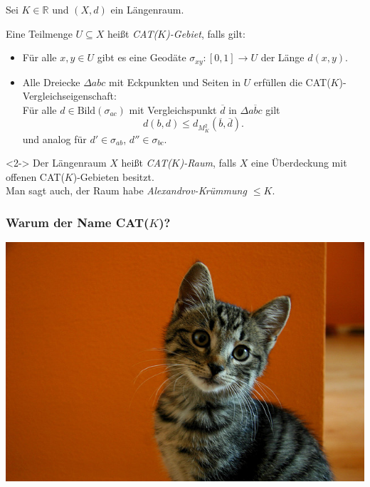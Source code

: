 \documentclass{beamer}
\newcommand{\R}{\mathbb{R}} %
\newcommand{\Bild}{\mathrm{Bild}} %
\theoremstyle{definition}
\begin{document}
\begin{frame}
  Sei $K \in \R$ und $(X, d)$ ein Längenraum.

  \begin{definition}
    Eine Teilmenge $U \subseteq X$ heißt \emph{CAT($K$)-Gebiet}, falls gilt:
    \begin{itemize}
      \item Für alle $x, y \in U$ gibt es eine Geodäte $\sigma_{xy} : \left[0,1\right] \to U$ der Länge $d(x, y)$.
      \item Alle Dreiecke $\Delta abc$ mit Eckpunkten und Seiten in $U$ erfüllen die CAT($K$)-Vergleichseigenschaft:\\
      Für alle $d \in \Bild(\sigma_{ac})$ mit Vergleichspunkt $\overline{d}$ in $\Delta \overline{abc}$ gilt
      \[ d(b, d) \leq d_{M_K^2}(\overline{b}, \overline{d}). \]
      und analog für $d' \in \sigma_{ab}$, $d'' \in \sigma_{bc}$.
    \end{itemize}
  \end{definition}

  \begin{definition}<2->
    Der Längenraum $X$ heißt \emph{CAT($K$)-Raum}, falls $X$ eine Überdeckung mit offenen CAT($K$)-Gebieten besitzt.\\
    Man sagt auch, der Raum habe \emph{Alexandrov-Krümmung $\leq K$}.
  \end{definition}
\end{frame}

\begin{frame}
  \frametitle{Warum der Name CAT($K$)?}

  \begin{center}
    \includegraphics[scale=0.4]{bilder/cat.jpg}
  \end{center}
\end{frame}
\end{document}
